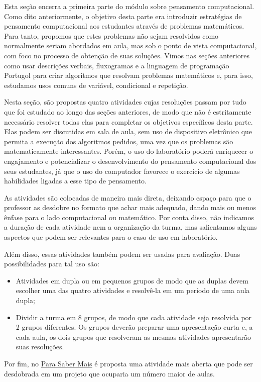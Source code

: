 \clearmargin
\begin{texto}
{\def\currentcolor{session2}
	Esta seção encerra a primeira parte do módulo sobre pensamento computacional. Como dito anteriormente, o objetivo desta parte era introduzir estratégias de pensamento computacional aos estudantes através de problemas matemáticos. Para tanto, propomos que estes problemas não sejam resolvidos como normalmente seriam abordados em aula, mas sob o ponto de vista computacional, com foco no processo de obtenção de suas soluções. Vimos nas seções anteriores como usar descrições verbais, fluxogramas e a linguagem de programação Portugol para criar algoritmos que resolvam problemas matemáticos e, para isso, estudamos usos comuns de variável, condicional e repetição.

	Nesta seção, são propostas quatro atividades cujas resoluções passam por tudo que foi estudado ao longo das seções anteriores, de modo que não é estritamente necessário resolver todas elas para completar os objetivos específicos desta parte. Elas podem ser discutidas em sala de aula, sem uso de dispositivo eletrônico que permita a execução dos algoritmos pedidos, uma vez que os problemas são matematicamente interessantes. Porém, o uso do laboratório poderá enriquecer o engajamento e potencializar o desenvolvimento do pensamento computacional dos seus estudantes, já que o uso do computador favorece o exercício de algumas habilidades ligadas a esse tipo de pensamento.

	As atividades são colocadas de maneira mais direta, deixando espaço para que o professor as desdobre no formato que achar mais adequado, dando mais ou menos ênfase para o lado computacional ou matemático. Por conta disso, não indicamos a duração de cada atividade nem a organização da turma, mas salientamos alguns aspectos que podem ser relevantes para o caso de uso em laboratório.

	Além disso, essas atividades também podem ser usadas para avaliação. Duas possibilidades para tal uso são:

	\begin{itemize}[topsep=0pt]
	\item Atividades em dupla ou em pequenos grupos de modo que as duplas devem escolher uma das quatro atividades e resolvê-la em um período de uma aula dupla;

	\item Dividir a turma em 8 grupos, de modo que cada atividade seja resolvida por 2 grupos diferentes. Os grupos deverão preparar uma apresentação curta e, a cada aula, os dois grupos que resolveram as mesmas atividades apresentarão suas resoluções.
	\end{itemize}

	Por fim, no \hyperref[comp-know1]{Para Saber Mais} é proposta uma atividade mais aberta que pode ser desdobrada em um projeto que ocuparia um número maior de aulas.
}
\end{texto}


